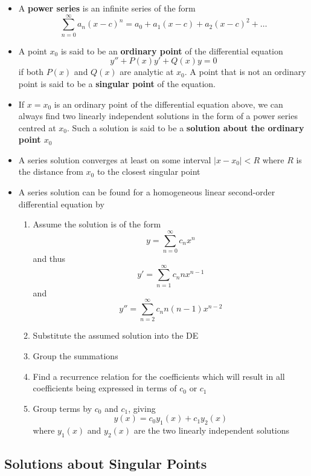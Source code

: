 \documentclass{article}
\begin{document}
\begin{itemize}
  \item A \textbf{power series} is an infinite series of the form \[\sum_{n = 0}^\infty a_n (x - c)^n = a_0 + a_1 (x - c) + a_2 (x - c)^2 + \ldots\]

  \item A point $x_0$ is said to be an \textbf{ordinary point} of the differential equation \[y'' + P(x) y' + Q(x) y = 0\] if both $P(x)$ and $Q(x)$ are analytic at $x_0$. A point that is not an ordinary point is said to be a \textbf{singular point} of the equation.

  \item If $x = x_0$ is an ordinary point of the differential equation above, we can always find two linearly independent solutions in the form of a power series centred at $x_0$. Such a solution is said to be a \textbf{solution about the ordinary point $x_0$}

  \item A series solution converges at least on some interval $|x - x_0| < R$ where $R$ is the distance from $x_0$ to the closest singular point

  \item A series solution can be found for a homogeneous linear second-order differential equation by

        \begin{enumerate}
          \item Assume the solution is of the form \[y = \sum_{n = 0}^\infty c_n x^n\] and thus \[y' = \sum_{n = 1}^\infty c_n n x^{n - 1}\] and \[y'' = \sum_{n = 2}^\infty c_n n (n - 1) x^{n - 2}\]

          \item Substitute the assumed solution into the DE

          \item Group the summations

          \item Find a recurrence relation for the coefficients which will result in all coefficients being expressed in terms of $c_0$ or $c_1$

          \item Group terms by $c_0$ and $c_1$, giving \[y(x) = c_0 y_1(x) + c_1 y_2(x)\] where $y_1(x)$ and $y_2(x)$ are the two linearly independent solutions
        \end{enumerate}
\end{itemize}

\subsection{Solutions about Singular Points}
\end{document}
